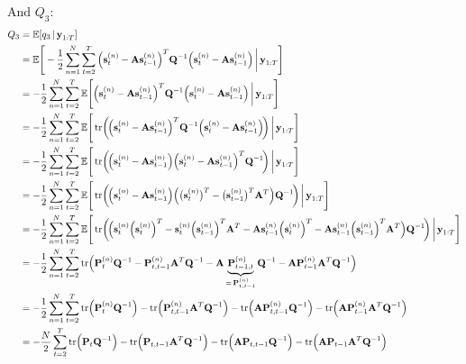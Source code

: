 And \(Q_3\):
\begin{align*}
	Q_3
		&= \E[q_3 \given \vec{y}_{1:T}] \\
		&= \E\Bigg[ -\frac{1}{2} \sum_{n = 1}^{N} \sum_{t = 2}^{T} \Big( \vec{s}_t^{(n)} - \mat{A} \vec{s}_{t - 1}^{(n)} \Big)^T \mat{Q}^{-1} \Big( \vec{s}_t^{(n)} - \mat{A} \vec{s}_{t - 1}^{(n)} \Big) \bigggiven \vec{y}_{1:T} \Bigg] \\
		&= -\frac{1}{2} \sum_{n = 1}^{N} \sum_{t = 2}^{T} \E\Bigg[ \Big( \vec{s}_t^{(n)} - \mat{A} \vec{s}_{t - 1}^{(n)} \Big)^T \mat{Q}^{-1} \Big( \vec{s}_t^{(n)} - \mat{A} \vec{s}_{t - 1}^{(n)} \Big) \bigggiven \vec{y}_{1:T} \Bigg] \\
		&= -\frac{1}{2} \sum_{n = 1}^{N} \sum_{t = 2}^{T} \E\Bigg[ \tr\!\bigg(\!\Big( \vec{s}_t^{(n)} - \mat{A} \vec{s}_{t - 1}^{(n)} \Big)^T \mat{Q}^{-1} \Big( \vec{s}_t^{(n)} - \mat{A} \vec{s}_{t - 1}^{(n)} \Big)\!\bigg) \bigggiven \vec{y}_{1:T} \Bigg] \\
		&= -\frac{1}{2} \sum_{n = 1}^{N} \sum_{t = 2}^{T} \E\Bigg[ \tr\!\bigg(\!\Big( \vec{s}_t^{(n)} - \mat{A} \vec{s}_{t - 1}^{(n)} \Big) \Big( \vec{s}_t^{(n)} - \mat{A} \vec{s}_{t - 1}^{(n)} \Big)^T \mat{Q}^{-1} \!\bigg) \bigggiven \vec{y}_{1:T} \Bigg] \\
		&= -\frac{1}{2} \sum_{n = 1}^{N} \sum_{t = 2}^{T} \E\Bigg[ \tr\!\bigg(\!\Big( \vec{s}_t^{(n)} - \mat{A} \vec{s}_{t - 1}^{(n)} \Big) \Big(\big(\vec{s}_t^{(n)}\big)^T - \big(\vec{s}_{t - 1}^{(n)}\big)^T \mat{A}^T \Big) \mat{Q}^{-1} \!\bigg) \bigggiven \vec{y}_{1:T} \Bigg] \\
		&= -\frac{1}{2} \sum_{n = 1}^{N} \sum_{t = 2}^{T} \E\Bigg[ \tr\!\bigg(\!\Big( \vec{s}_t^{(n)} \Big(\vec{s}_t^{(n)}\Big)^T - \vec{s}_t^{(n)} \Big(\vec{s}_{t - 1}^{(n)}\Big)^T \mat{A}^T - \mat{A} \vec{s}_{t - 1}^{(n)} \Big(\vec{s}_t^{(n)}\Big)^T - \mat{A} \vec{s}_{t - 1}^{(n)} \Big(\vec{s}_{t - 1}^{(n)}\Big)^T \mat{A}^T \Big) \mat{Q}^{-1} \!\bigg) \bigggiven \vec{y}_{1:T} \Bigg] \\
		&= -\frac{1}{2} \sum_{n = 1}^{N} \sum_{t = 2}^{T} \tr\!\Big( \mat{P}_t^{(n)} \mat{Q}^{-1} - \mat{P}_{t, t - 1}^{(n)} \mat{A}^T \mat{Q}^{-1} - \mat{A} \underbrace{\mat{P}_{t - 1, t}^{(n)}}_{=\, \mat{P}_{t, t - 1}^{(n)}} \mat{Q}^{-1} - \mat{A} \mat{P}_{t - 1}^{(n)} \mat{A}^T \mat{Q}^{-1} \Big) \\
		&= -\frac{1}{2} \sum_{n = 1}^{N} \sum_{t = 2}^{T} \tr\!\Big( \mat{P}_t^{(n)} \mat{Q}^{-1} \Big) - \tr\!\Big( \mat{P}_{t, t - 1}^{(n)} \mat{A}^T \mat{Q}^{-1} \Big) - \tr\!\Big( \mat{A} \mat{P}_{t, t - 1}^{(n)} \mat{Q}^{-1} \Big) - \tr\!\Big( \mat{A} \mat{P}_{t - 1}^{(n)} \mat{A}^T \mat{Q}^{-1} \Big) \\
		&= -\frac{N}{2} \sum_{t = 2}^{T} \tr\!\Big( \mat{P}_t \mat{Q}^{-1} \Big) - \tr\!\Big( \mat{P}_{t, t - 1} \mat{A}^T \mat{Q}^{-1} \Big) - \tr\!\Big( \mat{A} \mat{P}_{t, t - 1} \mat{Q}^{-1} \Big) - \tr\!\Big( \mat{A} \mat{P}_{t - 1} \mat{A}^T \mat{Q}^{-1} \Big)
\end{align*}
